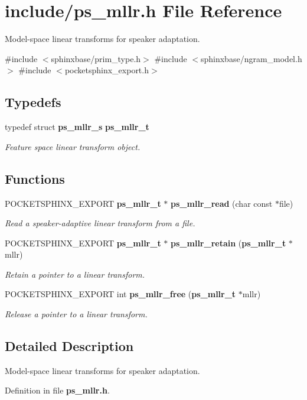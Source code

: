 \section{include/ps\-\_\-mllr.h \-File \-Reference}
\label{ps__mllr_8h}


\-Model-\/space linear transforms for speaker adaptation.  


{\ttfamily \#include $<$sphinxbase/prim\-\_\-type.\-h$>$}\*
{\ttfamily \#include $<$sphinxbase/ngram\-\_\-model.\-h$>$}\*
{\ttfamily \#include $<$pocketsphinx\-\_\-export.\-h$>$}\*
\subsection*{\-Typedefs}
\begin{DoxyCompactItemize}
\item 
typedef struct {\bf ps\-\_\-mllr\-\_\-s} {\bf ps\-\_\-mllr\-\_\-t}\label{ps__mllr_8h_ad4b6bf4c3cb6a671f79f1d709857d5b1}

\begin{DoxyCompactList}\small\item\em \-Feature space linear transform object. \end{DoxyCompactList}\end{DoxyCompactItemize}
\subsection*{\-Functions}
\begin{DoxyCompactItemize}
\item 
\-P\-O\-C\-K\-E\-T\-S\-P\-H\-I\-N\-X\-\_\-\-E\-X\-P\-O\-R\-T {\bf ps\-\_\-mllr\-\_\-t} $\ast$ {\bf ps\-\_\-mllr\-\_\-read} (char const $\ast$file)\label{ps__mllr_8h_a05d268b1d79a1be2ae96093c96aad79d}

\begin{DoxyCompactList}\small\item\em \-Read a speaker-\/adaptive linear transform from a file. \end{DoxyCompactList}\item 
\-P\-O\-C\-K\-E\-T\-S\-P\-H\-I\-N\-X\-\_\-\-E\-X\-P\-O\-R\-T {\bf ps\-\_\-mllr\-\_\-t} $\ast$ {\bf ps\-\_\-mllr\-\_\-retain} ({\bf ps\-\_\-mllr\-\_\-t} $\ast$mllr)\label{ps__mllr_8h_a2f40deff6976bf03a845aa474494edfb}

\begin{DoxyCompactList}\small\item\em \-Retain a pointer to a linear transform. \end{DoxyCompactList}\item 
\-P\-O\-C\-K\-E\-T\-S\-P\-H\-I\-N\-X\-\_\-\-E\-X\-P\-O\-R\-T int {\bf ps\-\_\-mllr\-\_\-free} ({\bf ps\-\_\-mllr\-\_\-t} $\ast$mllr)\label{ps__mllr_8h_ae56a8c52dd7513b1883536f2a729e1d0}

\begin{DoxyCompactList}\small\item\em \-Release a pointer to a linear transform. \end{DoxyCompactList}\end{DoxyCompactItemize}


\subsection{\-Detailed \-Description}
\-Model-\/space linear transforms for speaker adaptation. 

\-Definition in file {\bf ps\-\_\-mllr.\-h}.


